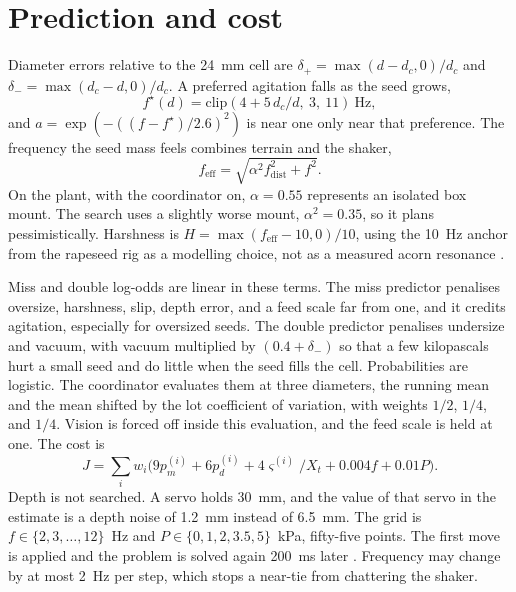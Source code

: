 \documentclass[11pt,a4paper]{article}
\begin{document}
\section{Prediction and cost}

Diameter errors relative to the 24~mm cell are $\delta_{+}=\max(d-d_c,0)/d_c$ and $\delta_{-}=\max(d_c-d,0)/d_c$. A preferred agitation falls as the seed grows,
\begin{equation}
f^{\star}(d)=\mathrm{clip}(4+5\,d_c/d,\ 3,\ 11)\ \text{Hz},
\label{eq:fs}
\end{equation}
and $a=\exp(-((f-f^{\star})/2.6)^2)$ is near one only near that preference. The frequency the seed mass feels combines terrain and the shaker,
\begin{equation}
f_{\mathrm{eff}}=\sqrt{\alpha^2 f_{\mathrm{dist}}^2+f^2}.
\label{eq:fe}
\end{equation}
On the plant, with the coordinator on, $\alpha=0.55$ represents an isolated box mount. The search uses a slightly worse mount, $\alpha^2=0.35$, so it plans pessimistically. Harshness is $H=\max(f_{\mathrm{eff}}-10,0)/10$, using the 10~Hz anchor from the rapeseed rig as a modelling choice, not as a measured acorn resonance \cite{zhang2024}.

Miss and double log-odds are linear in these terms. The miss predictor penalises oversize, harshness, slip, depth error, and a feed scale far from one, and it credits agitation, especially for oversized seeds. The double predictor penalises undersize and vacuum, with vacuum multiplied by $(0.4+\delta_{-})$ so that a few kilopascals hurt a small seed and do little when the seed fills the cell. Probabilities are logistic. The coordinator evaluates them at three diameters, the running mean and the mean shifted by the lot coefficient of variation, with weights $1/2$, $1/4$, and $1/4$. Vision is forced off inside this evaluation, and the feed scale is held at one. The cost is
\begin{equation}
J=\sum_i w_i\big(9p_m^{(i)}+6p_d^{(i)}+4\varsigma^{(i)}/X_t+0.004f+0.01P\big).
\label{eq:J}
\end{equation}
Depth is not searched. A servo holds 30~mm, and the value of that servo in the estimate is a depth noise of 1.2~mm instead of 6.5~mm. The grid is $f\in\{2,3,\ldots,12\}$~Hz and $P\in\{0,1,2,3.5,5\}$~kPa, fifty-five points. The first move is applied and the problem is solved again 200~ms later \cite{mayne2000}. Frequency may change by at most 2~Hz per step, which stops a near-tie from chattering the shaker.
\end{document}
